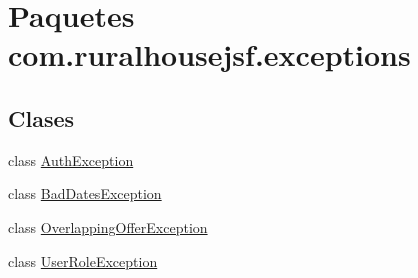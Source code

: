 \hypertarget{namespacecom_1_1ruralhousejsf_1_1exceptions}{}\section{Paquetes com.\+ruralhousejsf.\+exceptions}
\label{namespacecom_1_1ruralhousejsf_1_1exceptions}
\subsection*{Clases}
\begin{DoxyCompactItemize}
\item 
class \mbox{\hyperlink{classcom_1_1ruralhousejsf_1_1exceptions_1_1_auth_exception}{Auth\+Exception}}
\item 
class \mbox{\hyperlink{classcom_1_1ruralhousejsf_1_1exceptions_1_1_bad_dates_exception}{Bad\+Dates\+Exception}}
\item 
class \mbox{\hyperlink{classcom_1_1ruralhousejsf_1_1exceptions_1_1_overlapping_offer_exception}{Overlapping\+Offer\+Exception}}
\item 
class \mbox{\hyperlink{classcom_1_1ruralhousejsf_1_1exceptions_1_1_user_role_exception}{User\+Role\+Exception}}
\end{DoxyCompactItemize}
